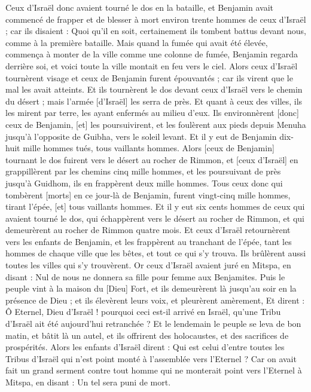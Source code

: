 \begin{multicols}{2}
Ceux d'Israël donc avaient tourné le dos en la bataille, et Benjamin avait commencé de frapper et de blesser à mort environ trente hommes de ceux d'Israël ; car ils disaient : Quoi qu'il en soit, certainement ils tombent battus devant nous, comme à la première bataille.
Mais quand la fumée qui avait été élevée, commença à monter de la ville comme une colonne de fumée, Benjamin regarda derrière soi, et voici toute la ville montait en feu vers le ciel.
Alors ceux d'Israël tournèrent visage et ceux de Benjamin furent épouvantés ; car ils virent que le mal les avait atteints.
Et ils tournèrent le dos devant ceux d'Israël vers le chemin du désert ; mais l'armée [d'Israël] les serra de près. Et quant à ceux des villes, ils les mirent par terre, les ayant enfermés au milieu d'eux.
Ils environnèrent [donc] ceux de Benjamin, [et] les poursuivirent, et les foulèrent aux pieds depuis Menuha jusqu'à l'opposite de Guibha, vers le soleil levant.
Et il y eut de Benjamin dix-huit mille hommes tués, tous vaillants hommes.
Alors [ceux de Benjamin] tournant le dos fuirent vers le désert au rocher de Rimmon, et [ceux d'Israël] en grappillèrent par les chemins cinq mille hommes, et les poursuivant de près jusqu'à Guidhom, ils en frappèrent deux mille hommes.
Tous ceux donc qui tombèrent [morts] en ce jour-là de Benjamin, furent vingt-cinq mille hommes, tirant l'épée, [et] tous vaillants hommes.
Et il y eut six cents hommes de ceux qui avaient tourné le dos, qui échappèrent vers le désert au rocher de Rimmon, et qui demeurèrent au rocher de Rimmon quatre mois.
Et ceux d'Israël retournèrent vers les enfants de Benjamin, et les frappèrent au tranchant de l'épée, tant les hommes de chaque ville que les bêtes, et tout ce qui s'y trouva. Ils brûlèrent aussi toutes les villes qui s'y trouvèrent.
\VerseOne{}Or ceux d'Israël avaient juré en Mitspa, en disant : Nul de nous ne donnera sa fille pour femme aux Benjamites.
Puis le peuple vint à la maison du [Dieu] Fort, et ils demeurèrent là jusqu'au soir en la présence de Dieu ; et ils élevèrent leurs voix, et pleurèrent amèrement,
Et dirent : Ô Eternel, Dieu d'Israël ! pourquoi ceci est-il arrivé en Israël, qu'une Tribu d'Israël ait été aujourd'hui retranchée ?
Et le lendemain le peuple se leva de bon matin, et bâtit là un autel, et ils offrirent des holocaustes, et des sacrifices de prospérités.
Alors les enfants d'Israël dirent : Qui est celui d'entre toutes les Tribus d'Israël qui n'est point monté à l'assemblée vers l'Eternel ? Car on avait fait un grand serment contre tout homme qui ne monterait point vers l'Eternel à Mitspa, en disant : Un tel sera puni de mort.

\end{multicols}
